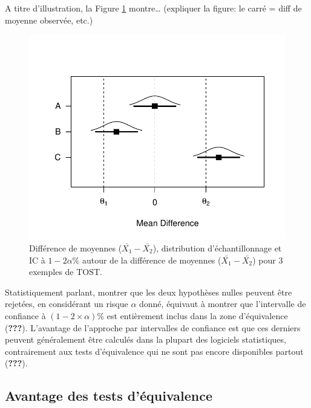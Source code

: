 \documentclass[
  english,
  man]{apa6}
\begin{document}
A titre d'illustration, la Figure \ref{fig:equiv1} montre\ldots{} (expliquer la figure: le carré = diff de moyenne observée, etc.)

\begin{figure}

{\centering \includegraphics{chp5_files/figure-latex/equiv1-1} 

}

\caption{Différence de moyennes ($\bar{X_1}-\bar{X_2}$), distribution d'échantillonnage et IC à $1-2\alpha\%$ autour de la différence de moyennes ($\bar{X_1}-\bar{X_2}$) pour 3 exemples de TOST.}\label{fig:equiv1}
\end{figure}

Statistiquement parlant, montrer que les deux hypothèses nulles peuvent être rejetées, en considérant un risque \(\alpha\) donné, équivaut à montrer que l'intervalle de confiance à \((1-2\times\alpha)\%\) est entièrement inclus dans la zone d'équivalence ({\textbf{???}}). L'avantage de l'approche par intervalles de confiance est que ces derniers peuvent généralement être calculés dans la plupart des logiciels statistiques, contrairement aux tests d'équivalence qui ne sont pas encore disponibles partout ({\textbf{???}}).

\hypertarget{avantage-des-tests-duxe9quivalence}{%
\subsection{Avantage des tests d'équivalence}\label{avantage-des-tests-duxe9quivalence}}
\end{document}

